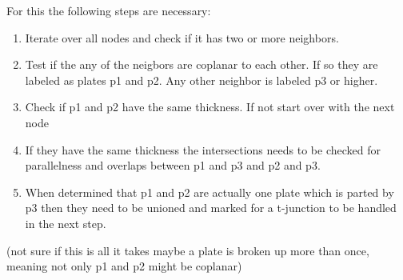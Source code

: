 \documentclass[../ClassicThesis.tex]{subfiles}
\begin{document}
\begin{itemize}
    For this the following steps are necessary:
    \begin{enumerate}
        \item Iterate over all nodes and check if it has two or more neighbors. 
        \item Test if the any of the neigbors are coplanar to each other. If so they are labeled as plates p1 and p2. Any other neighbor is labeled p3 or higher.
        \item Check if p1 and p2 have the same thickness. If not start over with the next node
        \item If they have the same thickness the intersections needs to be checked for parallelness and overlaps between p1 and p3 and p2 and p3.
        \item When determined that p1 and p2 are actually one plate which is parted by p3 then they need to be unioned and marked for a t-junction to be handled in the next step.
    \end{enumerate}
    (not sure if this is all it takes maybe a plate is broken up more than once, meaning not only p1 and p2 might be coplanar)
\end{itemize}










\end{document}
